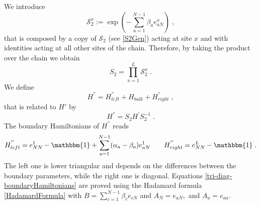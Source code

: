 \documentclass[10pt]{article}
\numberwithin{equation}{section}
\numberwithin{equation}{subsection}
\newcommand{\co}{\;,}
\newcommand{\dt}{\;.}
\begin{document}
We introduce
 \begin{equation}
 	\mathcal{S}_{2}^{x}:=\exp{\left(-\sum_{a=1}^{N-1}\beta_{a}e_{aN}^{x}\right)}\co%
 \end{equation}
that is composed by a copy of $\mathcal{S}_{2}$ (see \eqref{S2Gen}) acting at site $x$ and with identities acting at all other sites of the chain. 
Therefore, by taking the product over the chain we obtain 
\begin{equation}\label{S2-Whole}
	S_{2}=\prod_{x=1}^{L}\mathcal{S}_{2}^{x}\dt
\end{equation}
We define 
\begin{equation}\label{HSecond}
	H^{''}=H_{left}^{''}+H_{bulk}+H_{right}^{''}\co
\end{equation}
that is related to $H'$ by
\begin{equation}
	H^{''}=S_{2}H^{'}S_{2}^{-1}\dt
\end{equation}
The boundary Hamiltonians of $H^{''}$ reads
\begin{align}\label{tri-diag-boundaryHamiltonians}
	H_{left}^{''}=e_{NN}^{1}-\mathbbm{1}+\sum_{a=1}^{N-1}(\alpha_{a}-\beta_{a})e_{aN}^{1}\qquad H_{right}^{''}=e_{NN}^{L}-\mathbbm{1}\dt
\end{align}
The left one is lower triangular and depends on the differences between the boundary parameters, while the right one is diagonal. Equations \eqref{tri-diag-boundaryHamiltonians} are proved using the Hadamard formula \eqref{HadamardFormula} with $B=\sum_{c=1}^{N-1}\beta_{c}e_{cN}$ and $A_{N}=e_{aN},$ and $A_{a}=e_{aa}$.
\begin{comment}
 We compute
\begin{enumerate}
	\item $A_{N}=e_{aN}$ with $a\neq 1$
	\begin{equation}
		\exp{\left(-\sum_{c=1}^{N-1}\beta_{c}e_{cN}\right)}e_{aN}\exp{\left(\sum_{c=1}^{N-1}\beta_{c}e_{cN}\right)}=e_{aN}
	\end{equation}
\item $A_{a}=e_{aa}$ with $a\neq 1$
\begin{equation}
		\exp{\left(-\sum_{c=1}^{N-1}\beta_{c}e_{cN}\right)}e_{aa}\exp{\left(\sum_{c=1}^{N}\beta_{c}e_{cN}\right)}=e_{aa}+\beta_{a}e_{aN}
	\end{equation}
Indeed 
\begin{equation}
	\sum_{c=1}^{N-1}[e_{cN},e_{aa}]=\sum_{c=1}^{N-1}\beta_{c}\left(e_{ca}\delta_{aN}-e_{aN}\delta_{ca}\right)=-\beta_{a}e_{aN}
\end{equation}
\end{enumerate}
\end{comment}
\end{document}
